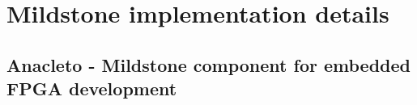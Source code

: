\chapter{Mildstone implementation details}



\section{Anacleto - Mildstone component for embedded FPGA development}

